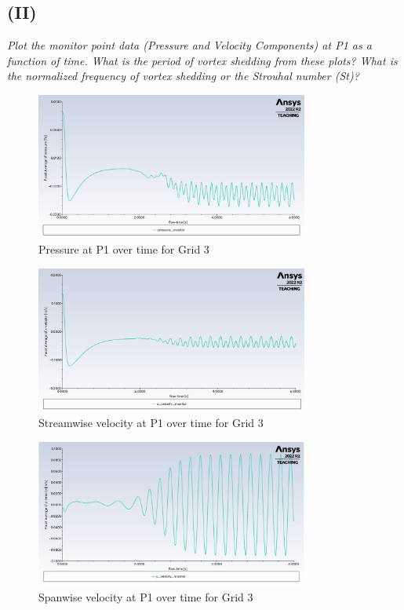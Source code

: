 \subsection{(II)}
\textit{Plot the monitor point data (Pressure and Velocity Components) at P1 as a function of time. What is the period of vortex shedding from these plots? What is the normalized frequency of vortex shedding or the Strouhal number (St)?}
\begin{figure}[H]
    \centering
    \includegraphics[width=0.8\textwidth]{Questions/Figures/pressure plot grid 3.png}
    \caption{Pressure at P1 over time for Grid 3}
\end{figure}
\begin{figure}[H]
    \centering
    \includegraphics[width=0.8\textwidth]{Questions/Figures/x-velocity plot grid 3.png}
    \caption{Streamwise velocity at P1 over time for Grid 3}
\end{figure}
\begin{figure}[H]
    \centering
    \includegraphics[width=0.8\textwidth]{Questions/Figures/y-velocity plot grid 3.png}
    \caption{Spanwise velocity at P1 over time for Grid 3}
\end{figure}

